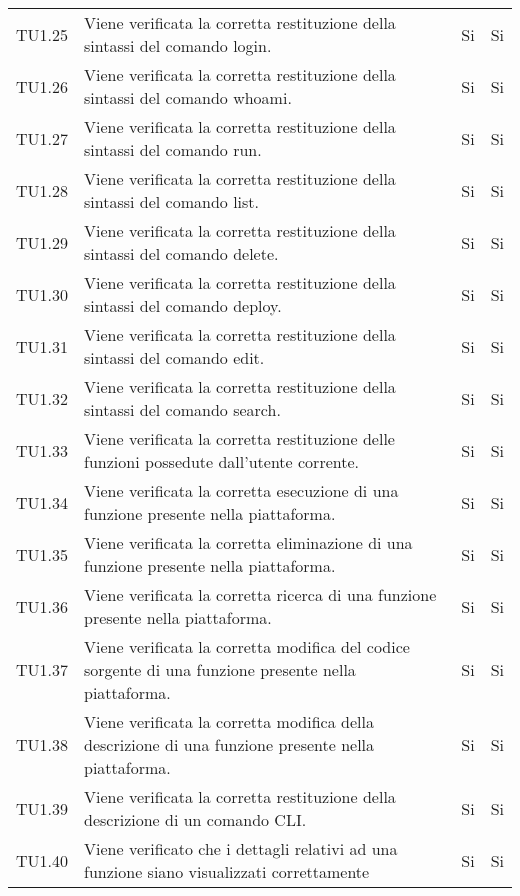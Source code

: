 \begin{longtable}{
		>{\centering}p{}
		>{}p{}
		>{\centering}p{}
		>{\centering}p{} }
		TU1.25 &
		Viene verificata la corretta restituzione della sintassi del comando login\ped{\textit{G}}. &
		Si &
		Si \tabularnewline
		
		TU1.26 &
		Viene verificata la corretta restituzione della sintassi del comando whoami. &
		Si &
		Si \tabularnewline
		
		TU1.27 &
		Viene verificata la corretta restituzione della sintassi del comando run. &
		Si &
		Si \tabularnewline
		
		TU1.28 &
		Viene verificata la corretta restituzione della sintassi del comando list. &
		Si &
		Si \tabularnewline
		
		TU1.29 &
		Viene verificata la corretta restituzione della sintassi del comando delete. &
		Si &
		Si \tabularnewline
		
		TU1.30 &
		Viene verificata la corretta restituzione della sintassi del comando deploy\ped{\textit{G}}. &
		Si &
		Si \tabularnewline
		
		TU1.31 &
		Viene verificata la corretta restituzione della sintassi del comando edit. &
		Si &
		Si \tabularnewline
		
		TU1.32 &
		Viene verificata la corretta restituzione della sintassi del comando search. &
		Si &
		Si \tabularnewline
		
		TU1.33 &
		Viene verificata la corretta restituzione delle funzioni possedute dall'utente corrente. &
		Si &
		Si \tabularnewline
		
		TU1.34 &
		Viene verificata la corretta esecuzione di una funzione presente nella piattaforma. &
		Si &
		Si \tabularnewline
		
		TU1.35 &
		Viene verificata la corretta eliminazione di una funzione presente nella piattaforma. &
		Si &
		Si \tabularnewline
		
		TU1.36 &
		Viene verificata la corretta ricerca di una funzione presente nella piattaforma.  &
		Si &
		Si \tabularnewline
		
		TU1.37 &
		Viene verificata la corretta modifica del codice sorgente di una funzione presente nella piattaforma. &
		Si &
		Si \tabularnewline
		
		TU1.38 &
		Viene verificata la corretta modifica della descrizione di una funzione presente nella piattaforma. &
		Si &
		Si \tabularnewline

		TU1.39 &
		Viene verificata la corretta restituzione della descrizione di un comando CLI\ped{\textit{G}}. &
		Si &
		Si \tabularnewline
		
		TU1.40 &
		Viene verificato che i dettagli relativi ad una funzione siano visualizzati correttamente &
		Si &
		Si \tabularnewline
		

\end{longtable}
